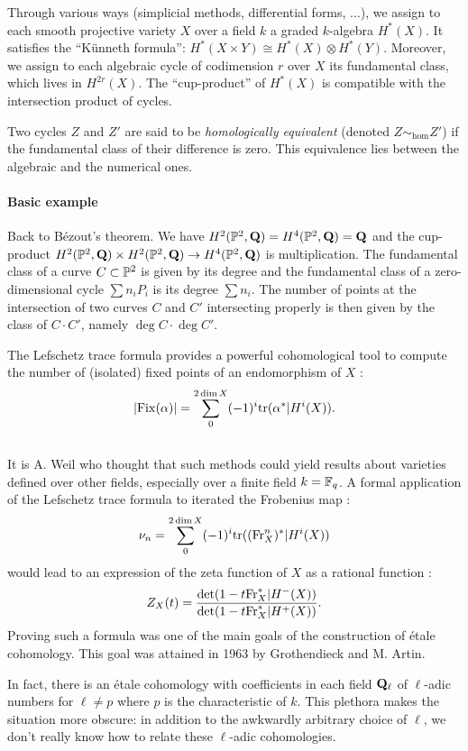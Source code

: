 \documentclass[../main.tex]{subfiles}
\begin{document}
Through various ways (simplicial methods, differential forms, ...), we assign to each smooth projective variety $X$ over a field $k$ a graded $k$-algebra $H^*(X)$.
It satisfies the \enquote{Künneth formula}: $H^*(X \times Y) \cong H^*(X) \otimes H^*(Y)$.
Moreover, we assign to each algebraic cycle of codimension $r$ over $X$ its fundamental class, which lives in $H^{2r}(X)$.
The \enquote{cup-product} of $H^*(X)$ is compatible with the intersection product of cycles.

Two cycles $Z$ and $Z'$ are said to be \emph{homologically equivalent} (denoted $Z \sim_{\hom} Z'$) if the fundamental class of their difference is zero.
This equivalence lies between the algebraic and the numerical ones.

\paragraph*{Basic example} Back to Bézout's theorem. We have $H^2(\P^2, \Q) = H^4(\P^2, \Q) = \Q$ and the cup-product $H^2(\P^2, \Q) \times H^2(\P^2, \Q) \to H^4(\P^2, \Q)$ is multiplication.
The fundamental class of a curve $C \subset \P^2$ is given by its degree and the fundamental class of a zero-dimensional cycle $\sum n_i P_i$ is its degree $\sum n_i$.
The number of points at the intersection of two curves $C$ and $C'$ intersecting properly is then given by the class of $C \cdot C'$, namely $\deg C \cdot \deg C'$.

The Lefschetz trace formula provides a powerful cohomological tool to compute the number of (isolated) fixed points of an endomorphism of $X$ :
$$|\mathrm{Fix}(\alpha)| = \sum_{0}^{2\dim X} (-1)^i \tr(\alpha^* | H^i(X)).$$

\subsection{} It is A. Weil who thought that such methods could yield results about varieties defined over other fields, especially over a finite field $k = \F_q$.
A formal application of the Lefschetz trace formula to iterated the Frobenius map :
$$\nu_n = \sum_0^{2\dim X} (-1)^i \tr((\Fr_X^n)^* | H^i(X))$$
would lead to an expression of the zeta function of $X$ as a rational function :
$$Z_X(t) = \frac{\det(1 - t \Fr_X^* | H^-(X))}{\det(1 - t \Fr_X^* | H^+(X))}.$$
Proving such a formula was one of the main goals of the construction of étale cohomology.
This goal was attained in 1963 by Grothendieck and M. Artin.

In fact, there is an étale cohomology with coefficients in each field $\Q_{\ell}$ of $\ell$-adic numbers for $\ell \neq p$ where $p$ is the characteristic of $k$.
This plethora makes the situation more obscure: in addition to the awkwardly arbitrary choice of $\ell$, we don't really know how to relate these $\ell$-adic cohomologies.
\end{document}
